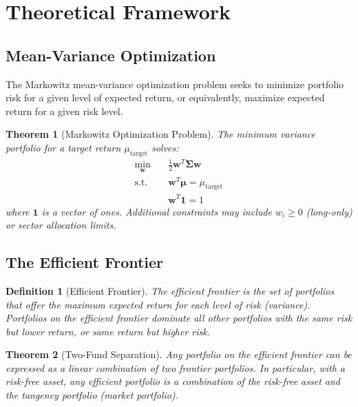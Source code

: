 \documentclass[a4paper, 11pt]{article}
\newtheorem{definition}{Definition}[section]
\newtheorem{theorem}{Theorem}[section]
\begin{document}
\section{Theoretical Framework}

\subsection{Mean-Variance Optimization}

The Markowitz mean-variance optimization problem seeks to minimize portfolio risk for a
given level of expected return, or equivalently, maximize expected return for a given risk level.

\begin{theorem}[Markowitz Optimization Problem]
The minimum variance portfolio for a target return $\mu_{\text{target}}$ solves:
\begin{equation}
\begin{aligned}
\min_{\mathbf{w}} \quad & \frac{1}{2}\mathbf{w}^T \boldsymbol{\Sigma} \mathbf{w} \\
\text{s.t.} \quad & \mathbf{w}^T \boldsymbol{\mu} = \mu_{\text{target}} \\
& \mathbf{w}^T \mathbf{1} = 1
\end{aligned}
\end{equation}
where $\mathbf{1}$ is a vector of ones. Additional constraints may include $w_i \geq 0$
(long-only) or sector allocation limits.
\end{theorem}

\subsection{The Efficient Frontier}

\begin{definition}[Efficient Frontier]
The efficient frontier is the set of portfolios that offer the maximum expected return for
each level of risk (variance). Portfolios on the efficient frontier dominate all other
portfolios with the same risk but lower return, or same return but higher risk.
\end{definition}

\begin{theorem}[Two-Fund Separation]
Any portfolio on the efficient frontier can be expressed as a linear combination of two
frontier portfolios. In particular, with a risk-free asset, any efficient portfolio is a
combination of the risk-free asset and the tangency portfolio (market portfolio).
\end{theorem}
\end{document}
